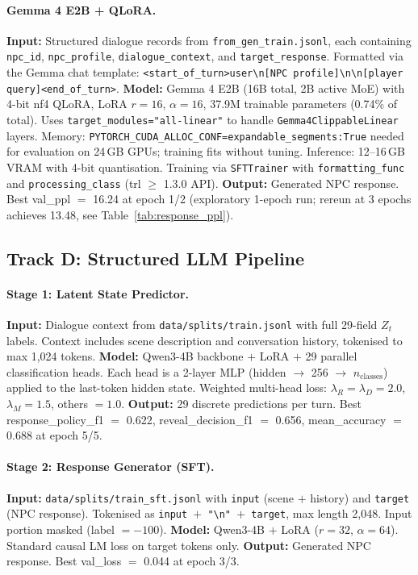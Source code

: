\documentclass[11pt]{article}
\begin{document}
\paragraph{Gemma 4 E2B + QLoRA.}
\textbf{Input:} Structured dialogue records from \texttt{from\_gen\_train.jsonl}, each containing \texttt{npc\_id}, \texttt{npc\_profile}, \texttt{dialogue\_context}, and \texttt{target\_response}.
Formatted via the Gemma chat template: \texttt{<start\_of\_turn>user\textbackslash n[NPC profile]\textbackslash n\textbackslash n[player query]<end\_of\_turn>}.
\textbf{Model:} Gemma 4 E2B (16B total, 2B active MoE) with 4-bit nf4 QLoRA, LoRA $r=16$, $\alpha=16$, 37.9M trainable parameters (0.74\% of total).
Uses \texttt{target\_modules="all-linear"} to handle \texttt{Gemma4ClippableLinear} layers.
Memory: \texttt{PYTORCH\_CUDA\_ALLOC\_CONF=expandable\_segments:True} needed for evaluation on 24\,GB GPUs; training fits without tuning.
Inference: 12--16\,GB VRAM with 4-bit quantisation.
Training via \texttt{SFTTrainer} with \texttt{formatting\_func} and \texttt{processing\_class} (trl $\geq$ 1.3.0 API).
\textbf{Output:} Generated NPC response.
Best val\_ppl $=$ 16.24 at epoch 1/2 (exploratory 1-epoch run; rereun at 3 epochs achieves 13.48, see Table~\ref{tab:response_ppl}).

\subsection{Track D: Structured LLM Pipeline}

\paragraph{Stage 1: Latent State Predictor.}
\textbf{Input:} Dialogue context from \texttt{data/splits/train.jsonl} with full 29-field $Z_t$ labels.
Context includes scene description and conversation history, tokenised to max 1,024 tokens.
\textbf{Model:} Qwen3-4B backbone $+$ LoRA $+$ 29 parallel classification heads.
Each head is a 2-layer MLP (hidden $\rightarrow$ 256 $\rightarrow$ $n_\text{classes}$) applied to the last-token hidden state.
Weighted multi-head loss: $\lambda_R = \lambda_D = 2.0$, $\lambda_M = 1.5$, others $=1.0$.
\textbf{Output:} 29 discrete predictions per turn.
Best response\_policy\_f1 $=$ 0.622, reveal\_decision\_f1 $=$ 0.656, mean\_accuracy $=$ 0.688 at epoch 5/5.

\paragraph{Stage 2: Response Generator (SFT).}
\textbf{Input:} \texttt{data/splits/train\_sft.jsonl} with \texttt{input} (scene $+$ history) and \texttt{target} (NPC response).
Tokenised as \texttt{input $+$ "\textbackslash n" $+$ target}, max length 2,048.
Input portion masked (label $=-100$).
\textbf{Model:} Qwen3-4B $+$ LoRA ($r=32$, $\alpha=64$). Standard causal LM loss on target tokens only.
\textbf{Output:} Generated NPC response.
Best val\_loss $=$ 0.044 at epoch 3/3.
\end{document}
